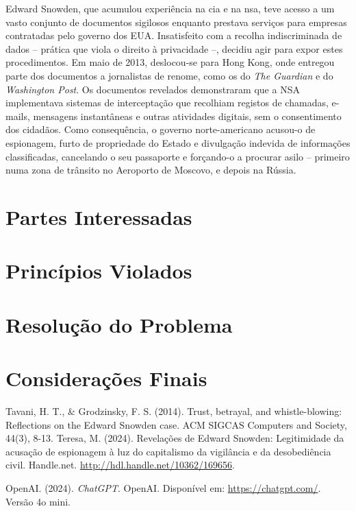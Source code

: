 \documentclass[a4paper,12pt]{article}
\begin{document}
Edward Snowden, que acumulou experiência na \acrshort{cia} e na \acrshort{nsa}, teve acesso a um vasto conjunto de documentos sigilosos enquanto prestava serviços para empresas contratadas pelo governo dos EUA. Insatisfeito com a recolha indiscriminada de dados – prática que viola o direito à privacidade –, decidiu agir para expor estes procedimentos. Em maio de 2013, deslocou-se para Hong Kong, onde entregou parte dos documentos a jornalistas de renome, como os do \textit{The Guardian} e do \textit{Washington Post}. Os documentos revelados demonstraram que a NSA implementava sistemas de interceptação que recolhiam registos de chamadas, e-mails, mensagens instantâneas e outras atividades digitais, sem o consentimento dos cidadãos. Como consequência, o governo norte-americano acusou-o de espionagem, furto de propriedade do Estado e divulgação indevida de informações classificadas, cancelando o seu passaporte e forçando-o a procurar asilo – primeiro numa zona de trânsito no Aeroporto de Moscovo, e depois na Rússia.




\section{Partes Interessadas}

\section{Princípios Violados}

\section{Resolução do Problema}

\section{Considerações Finais}

\begin{thebibliography}{10}

        Tavani, H. T., \& Grodzinsky, F. S. (2014). Trust, betrayal, and whistle-blowing: Reflections on the Edward Snowden case. ACM SIGCAS Computers and Society, 44(3), 8-13.
    Teresa, M. (2024). Revelações de Edward Snowden: Legitimidade da acusação de espionagem à luz do capitalismo da vigilância e da desobediência civil. Handle.net. \url{http://hdl.handle.net/10362/169656}.

    
    
        OpenAI. (2024). \textit{ChatGPT}. OpenAI. Disponível em: \url{https://chatgpt.com/}. Versão 4o mini.
    
   
\end{thebibliography}

\printglossaries
\end{document}
